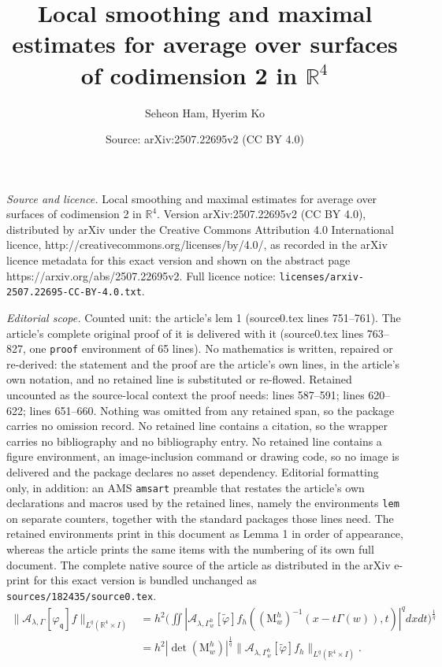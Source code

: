 \documentclass[10pt,a4paper]{amsart}
\title{Local smoothing and maximal estimates for average over surfaces of codimension 2 in $\mathbb R^4$}
\author{Seheon Ham, Hyerim Ko}
\date{Source: arXiv:2507.22695v2 (CC BY 4.0)}
\newcommand{\fq}{\mathfrak q}
\begin{document}
\maketitle

\noindent\emph{Source and licence.} Local smoothing and maximal estimates for average over surfaces of codimension 2 in $\mathbb R^4$. Version arXiv:2507.22695v2 (CC BY 4.0), distributed by arXiv under the Creative Commons Attribution 4.0 International licence, http://creativecommons.org/licenses/by/4.0/, as recorded in the arXiv licence metadata for this exact version and shown on the abstract page https://arxiv.org/abs/2507.22695v2. Full licence notice: \texttt{licenses/arxiv-2507.22695-CC-BY-4.0.txt}.\par\smallskip

\noindent\textit{Editorial scope.} Counted unit: the article's lem 1 (source0.tex lines 751--761). The article's complete original proof of it is delivered with it (source0.tex lines 763--827, one \texttt{proof} environment of 65 lines). No mathematics is written, repaired or re-derived: the statement and the proof are the article's own lines, in the article's own notation, and no retained line is substituted or re-flowed.  Retained uncounted as the source-local context the proof needs: lines 587--591; lines 620--622; lines 651--660.  Nothing was omitted from any retained span, so the package carries no omission record.  No retained line contains a citation, so the wrapper carries no bibliography and no bibliography entry.  No retained line contains a figure environment, an image-inclusion command or drawing code, so no image is delivered and the package declares no asset dependency.  Editorial formatting only, in addition: an AMS \texttt{amsart} preamble that restates the article's own declarations and macros used by the retained lines, namely the environments \texttt{lem} on separate counters, together with the standard packages those lines need.  The retained environments print in this document as Lemma 1 in order of appearance, whereas the article prints the same items with the numbering of its own full document.  The complete native source of the article as distributed in the arXiv e-print for this exact version is bundled unchanged as \texttt{sources/182435/source0.tex}.
\begin{align}
  \| \mathcal A_{\lambda,\Gamma} [\varphi_\fq] f \|_{L^q(\mathbb R^4\times I)}    
 & = h^2 \Big( \iint  |\mathcal A_{\lambda,\Gamma_{w}^h} [\widetilde\varphi ] f_h ((\mathrm M_w^h)^{-1}(x-t\Gamma(w)),t )|^q dx dt \Big)^{\frac1q} \nonumber \\
 & = h^2 |\det (\mathrm M_w^h)|^{\frac 1q}  \| \mathcal A_{\lambda,\Gamma_{w}^h} [\widetilde\varphi ] f_h \|_{L^q(\mathbb R^4\times I)} . \label{rescaled af}
\end{align}
\end{document}
